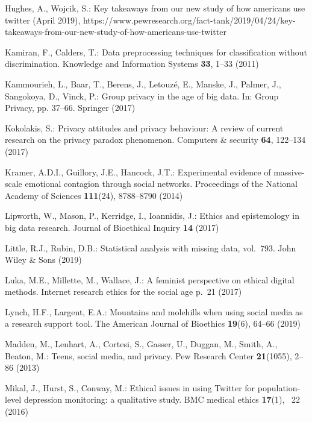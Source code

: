 \documentclass[11pt]{article} %
\begin{document}
\begin{thebibliography}{10}
\begin{small}
Hughes, A., Wojcik, S.: Key takeaways from our new study of how americans use
  twitter (April 2019),
  https://www.pewresearch.org/fact-tank/2019/04/24/key-takeaways-from-our-new-study-of-how-americans-use-twitter

Kamiran, F., Calders, T.: Data preprocessing techniques for classification
  without discrimination. Knowledge and Information Systems  \textbf{33},
  1--33 (2011)

Kammourieh, L., Baar, T., Berens, J., Letouzé, E., Manske, J., Palmer, J.,
  Sangokoya, D., Vinck, P.: Group privacy in the age of big data. In: Group
  {Privacy}, pp. 37--66. Springer (2017)

Kokolakis, S.: Privacy attitudes and privacy behaviour: {A} review of current
  research on the privacy paradox phenomenon. Computers \& security
  \textbf{64},  122--134 (2017)

Kramer, A.D.I., Guillory, J.E., Hancock, J.T.: Experimental evidence of
  massive-scale emotional contagion through social networks. Proceedings of the
  National Academy of Sciences  \textbf{111}(24),  8788--8790 (2014)

Lipworth, W., Mason, P., Kerridge, I., Ioannidis, J.: Ethics and epistemology
  in big data research. Journal of Bioethical Inquiry  \textbf{14} (2017)

Little, R.J., Rubin, D.B.: Statistical analysis with missing data, vol.~793.
  John Wiley \& Sons (2019)

Luka, M.E., Millette, M., Wallace, J.: A feminist perspective on ethical
  digital methods. Internet research ethics for the social age p.~21 (2017)

Lynch, H.F., Largent, E.A.: Mountains and molehills when using social media as
  a research support tool. The American Journal of Bioethics  \textbf{19}(6),
  64--66 (2019)

Madden, M., Lenhart, A., Cortesi, S., Gasser, U., Duggan, M., Smith, A.,
  Beaton, M.: Teens, social media, and privacy. Pew Research Center
  \textbf{21}(1055),  2--86 (2013)

Mikal, J., Hurst, S., Conway, M.: Ethical issues in using {Twitter} for
  population-level depression monitoring: a qualitative study. BMC medical
  ethics  \textbf{17}(1), ~22 (2016)


\end{small}
\end{thebibliography}
\end{document}
